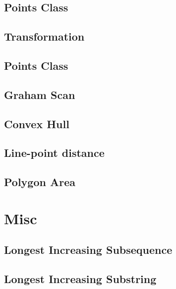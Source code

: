 \documentclass[a4paper]{article}
\begin{document}
\begin{multicols}{3}
\subsection{Points Class}


\subsection{Transformation}


\subsection{Points Class}


\subsection{Graham Scan}


\subsection{Convex Hull}


\subsection{Line-point distance}


\subsection{Polygon Area}


\section{Misc}
\subsection{Longest Increasing Subsequence}


\subsection{Longest Increasing Substring}


\end{multicols}
\end{document}
